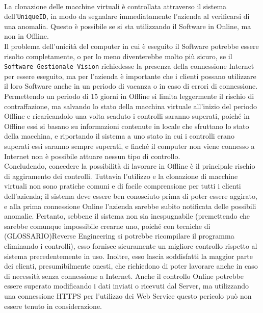 \\
La clonazione delle macchine virtuali è controllata attraverso il sistema dell'\texttt{UniqueID}, in modo da segnalare immediatamente l'azienda al verificarsi di una anomalia. Questo è possibile se si sta utilizzando il Software in Online, ma non in Offline.
\\
Il problema dell'unicità del computer in cui è eseguito il Software potrebbe essere risolto completamente, o per lo meno diventerebbe molto più sicuro, se il \texttt{Software Gestionale Vision} richiedesse la presenza della connessione Internet per essere eseguito, ma per l'azienda è importante che i clienti possano utilizzare il loro Software anche in un periodo di vacanza o in caso di errori di connessione. Permettendo un periodo di 15 giorni in Offline si limita leggermente il rischio di contraffazione, ma salvando lo stato della macchina virtuale all'inizio del periodo Offline e ricaricandolo una volta scaduto i controlli saranno superati, poiché in Offline essi si basano su informazioni contenute in locale che sfruttano lo stato della macchina, e riportando il sistema a uno stato in cui i controlli erano superati essi saranno sempre superati, e finché il computer non viene connesso a Internet non è possibile attuare nessun tipo di controllo.
\\Concludendo, concedere la possibilità di lavorare in Offline è il principale rischio di aggiramento dei controlli. Tuttavia l'utilizzo e la clonazione di macchine virtuali non sono pratiche comuni e di facile comprensione per tutti i clienti dell'azienda; il sistema deve essere ben conosciuto prima di poter essere aggirato, e alla prima connessione Online l'azienda sarebbe subito notificata delle possibili anomalie. Pertanto, sebbene il sistema non sia inespugnabile (premettendo che sarebbe comunque impossibile crearne uno, poiché con tecniche di (GLOSSARIO)Reverse Engineering si potrebbe ricompilare il programma eliminando i controlli), esso fornisce sicuramente un migliore controllo rispetto al sistema precedentemente in uso. Inoltre, esso lascia soddisfatti la maggior parte dei clienti, presumibilmente onesti, che richiedono di poter lavorare anche in caso di necessità senza connessione a Internet. Anche il controllo Online potrebbe essere superato modificando i dati inviati o ricevuti dal Server, ma utilizzando una connessione HTTPS per l'utilizzo dei Web Service questo pericolo può non essere tenuto in considerazione.